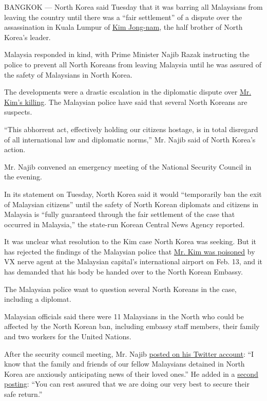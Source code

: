 BANGKOK --- North Korea said Tuesday that it was barring all Malaysians
from leaving the country until there was a ``fair settlement'' of a
dispute over the assassination in Kuala Lumpur of
\href{https://www.nytimes3xbfgragh.onion/2017/02/15/world/asia/kim-jong-nam-assassination-north-korea.html}{Kim
Jong-nam}, the half brother of North Korea's leader.

Malaysia responded in kind, with Prime Minister Najib Razak instructing
the police to prevent all North Koreans from leaving Malaysia until he
was assured of the safety of Malaysians in North Korea.

The developments were a drastic escalation in the diplomatic dispute
over
\href{https://www.nytimes3xbfgragh.onion/2017/02/22/world/asia/kim-jong-nam-assassination-korea-malaysia.html}{Mr.
Kim's killing}. The Malaysian police have said that several North
Koreans are suspects.

``This abhorrent act, effectively holding our citizens hostage, is in
total disregard of all international law and diplomatic norms,'' Mr.
Najib said of North Korea's action.

Mr. Najib convened an emergency meeting of the National Security Council
in the evening.

In its statement on Tuesday, North Korea said it would ``temporarily ban
the exit of Malaysian citizens'' until the safety of North Korean
diplomats and citizens in Malaysia is ``fully guaranteed through the
fair settlement of the case that occurred in Malaysia,'' the state-run
Korean Central News Agency reported.

It was unclear what resolution to the Kim case North Korea was seeking.
But it has rejected the findings of the Malaysian police that
\href{https://www.nytimes3xbfgragh.onion/2017/03/02/world/asia/kim-jong-nam-malaysia.html}{Mr.
Kim was poisoned} by VX nerve agent at the Malaysian capital's
international airport on Feb. 13, and it has demanded that his body be
handed over to the North Korean Embassy.

The Malaysian police want to question several North Koreans in the case,
including a diplomat.

Malaysian officials said there were 11 Malaysians in the North who could
be affected by the North Korean ban, including embassy staff members,
their family and two workers for the United Nations.

After the security council meeting, Mr. Najib
\href{https://twitter.com/NajibRazak/status/839133732489441280}{posted
on his Twitter account}: ``I know that the family and friends of our
fellow Malaysians detained in North Korea are anxiously anticipating
news of their loved ones.'' He added in a
\href{https://twitter.com/NajibRazak/status/839135526946914304}{second
posting}: ``You can rest assured that we are doing our very best to
secure their safe return.''

